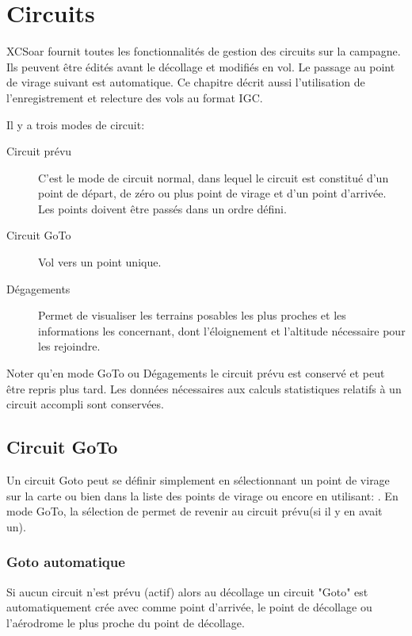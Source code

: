 \chapter{Circuits}\label{cha:tasks}

XCSoar fournit toutes les fonctionnalités de gestion des circuits sur la campagne. Ils peuvent être édités avant le décollage et modifiés en vol. Le passage au point de virage suivant est automatique. Ce chapitre décrit aussi l'utilisation de l'enregistrement et relecture des vols au format IGC.

Il y a trois modes de circuit:
\begin{description}
\item[Circuit prévu] C'est le mode de circuit normal, dans lequel le circuit est constitué d'un point de départ, de zéro ou plus point de virage et d'un point d'arrivée. Les points doivent être passés dans un ordre défini.
\item[Circuit GoTo] Vol vers un point unique.
\item[Dégagements] Permet de visualiser les terrains posables les plus proches et les informations les concernant, dont l'éloignement et l'altitude nécessaire pour les rejoindre. 
\end{description}

Noter qu'en mode GoTo ou Dégagements le circuit prévu est conservé et peut être repris plus tard. Les données nécessaires aux calculs statistiques relatifs à un circuit accompli sont conservées.

\section{Circuit GoTo}\label{sec:Goto-tasks}

Un circuit Goto peut se définir simplement en sélectionnant un point de virage sur la carte ou bien dans la liste des points de virage ou encore en utilisant:  \blink{} 
.  En mode GoTo, la sélection de 
\blink{} permet de revenir au circuit prévu(si il y en avait un).

\subsection*{Goto automatique}

Si aucun circuit n'est prévu (actif) alors au décollage un circuit "Goto" est automatiquement crée avec comme point d'arrivée, le point de décollage ou l'aérodrome le plus proche du point de décollage.


